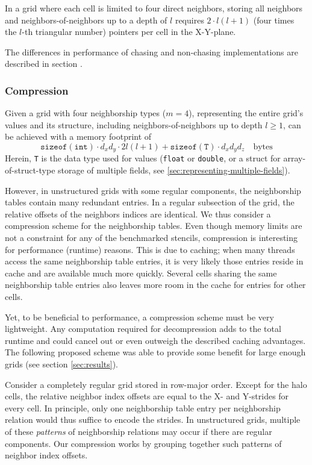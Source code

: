 In a grid where each cell is limited to four direct neighbors, storing all neighbors and neighbors-of-neighbors up to a depth of $l$ requires $2\cdot l(l+1)$ (four times the $l$-th triangular number) pointers per cell in the X-Y-plane.

The differences in performance of chasing and non-chasing implementations are described in section \label{results:chasing}.

\subsubsection{Compression}

Given a grid with four neighborship types ($m=4$), representing the entire grid's values and its structure, including neighbors-of-neighbors up to depth $l \geq 1$, can be achieved with a memory footprint of 
$$\mathtt{sizeof(int)} \cdot d_xd_y \cdot 2 l(l+1) + \mathtt{sizeof(T)}\cdot d_xd_yd_z \quad \text{bytes}$$
Herein, \texttt{T} is the data type used for values (\texttt{float} or \texttt{double}, or a struct for array-of-struct-type storage of multiple fields, see \ref{sec:representing-multiple-fields}).

However, in unstructured grids with some regular components, the neighborship tables contain many redundant entries. In a regular subsection of the grid, the relative offsets of the neighbors indices are identical. We thus consider a  compression scheme for the neighborship tables. Even though memory limits are not a constraint for any of the benchmarked stencils, compression is interesting for performance (runtime) reasons. This is due to caching; when many threads access the same neighborship table entries, it is very likely those entries reside in cache and are available much more quickly. Several cells sharing the same neighborship table entries also leaves more room in the cache for entries for other cells.

Yet, to be beneficial to performance, a compression scheme must be very lightweight. Any computation required for decompression adds to the total runtime and could cancel out or even outweigh the described caching advantages. The following proposed scheme was able to provide some benefit for large enough grids (see section \ref{sec:results}).

Consider a completely regular grid stored in row-major order. Except for the halo cells, the relative neighbor index offsets are equal to the X- and Y-strides for every cell. In principle, only one neighborship table entry per neighborship relation would thus suffice to encode the strides. In unstructured grids, multiple of these \emph{patterns} of neighborship relations may occur if there are regular components. Our compression works by grouping together such patterns of neighbor index offsets. 


